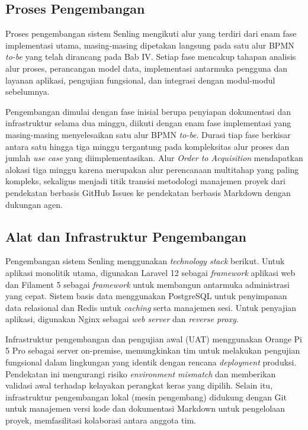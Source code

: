 \subsection{Proses Pengembangan}

Proses pengembangan sistem Senling mengikuti alur yang terdiri dari enam fase implementasi utama, masing-masing dipetakan langsung pada satu alur BPMN \textit{to-be} yang telah dirancang pada Bab IV. Setiap fase mencakup tahapan analisis alur proses, perancangan model data, implementasi antarmuka pengguna dan layanan aplikasi, pengujian fungsional, dan integrasi dengan modul-modul sebelumnya.

Pengembangan dimulai dengan fase inisial berupa penyiapan dokumentasi dan infrastruktur selama dua minggu, diikuti dengan enam fase implementasi yang masing-masing menyelesaikan satu alur BPMN \textit{to-be}. Durasi tiap fase berkisar antara satu hingga tiga minggu tergantung pada kompleksitas alur proses dan jumlah \textit{use case} yang diimplementasikan. Alur \textit{Order to Acquisition} mendapatkan alokasi tiga minggu karena merupakan alur perencanaan multitahap yang paling kompleks, sekaligus menjadi titik transisi metodologi manajemen proyek dari pendekatan berbasis GitHub Issues ke pendekatan berbasis Markdown dengan dukungan agen.

\subsection{Alat dan Infrastruktur Pengembangan}

Pengembangan sistem Senling menggunakan \textit{technology stack} berikut. Untuk aplikasi monolitik utama, digunakan Laravel 12 sebagai \textit{framework} aplikasi web dan Filament 5 sebagai \textit{framework} untuk membangun antarmuka administrasi yang cepat. Sistem basis data menggunakan PostgreSQL untuk penyimpanan data relasional dan Redis untuk \textit{caching} serta manajemen sesi. Untuk penyajian aplikasi, digunakan Nginx sebagai \textit{web server} dan \textit{reverse proxy}.

Infrastruktur pengembangan dan pengujian awal (UAT) menggunakan Orange Pi 5 Pro sebagai server on-premise, memungkinkan tim untuk melakukan pengujian fungsional dalam lingkungan yang identik dengan rencana \textit{deployment} produksi. Pendekatan ini mengurangi risiko \textit{environment mismatch} dan memberikan validasi awal terhadap kelayakan perangkat keras yang dipilih. Selain itu, infrastruktur pengembangan lokal (mesin pengembang) didukung dengan Git untuk manajemen versi kode dan dokumentasi Markdown untuk pengelolaan proyek, memfasilitasi kolaborasi antara anggota tim.

